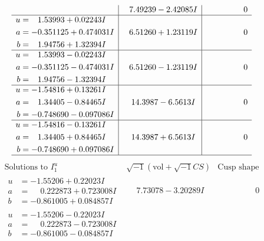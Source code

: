 \documentclass[1p]{elsarticle_modified}
\theoremstyle{definition}
\newcommand{\I}{\sqrt{-1}}
\begin{document}
$$\begin{array}{c|c|c}
 & \phantom{-}7.49239 - 2.42085 I & \phantom{-0.000000 } 0 \\ \hline\begin{aligned}
u &= \phantom{-}1.53993 + 0.02243 I \\
a &= -0.351125 + 0.474031 I \\
b &= \phantom{-}1.94756 + 1.32394 I\end{aligned}
 & \phantom{-}6.51260 + 1.23119 I & \phantom{-0.000000 } 0 \\ \hline\begin{aligned}
u &= \phantom{-}1.53993 - 0.02243 I \\
a &= -0.351125 - 0.474031 I \\
b &= \phantom{-}1.94756 - 1.32394 I\end{aligned}
 & \phantom{-}6.51260 - 1.23119 I & \phantom{-0.000000 } 0 \\ \hline\begin{aligned}
u &= -1.54816 + 0.13261 I \\
a &= \phantom{-}1.34405 - 0.84465 I \\
b &= -0.748690 - 0.097086 I\end{aligned}
 & \phantom{-}14.3987 - 6.5613 I & \phantom{-0.000000 } 0 \\ \hline\begin{aligned}
u &= -1.54816 - 0.13261 I \\
a &= \phantom{-}1.34405 + 0.84465 I \\
b &= -0.748690 + 0.097086 I\end{aligned}
 & \phantom{-}14.3987 + 6.5613 I & \phantom{-0.000000 } 0\\
 \hline 
 \end{array}$$\newpage$$\begin{array}{c|c|c}  
\text{Solutions to }I^u_{1}& \I (\text{vol} + \sqrt{-1}CS) & \text{Cusp shape}\\
 \hline 
\begin{aligned}
u &= -1.55206 + 0.22023 I \\
a &= \phantom{-}0.222873 + 0.723008 I \\
b &= -0.861005 + 0.084857 I\end{aligned}
 & \phantom{-}7.73078 - 3.20289 I & \phantom{-0.000000 } 0 \\ \hline\begin{aligned}
u &= -1.55206 - 0.22023 I \\
a &= \phantom{-}0.222873 - 0.723008 I \\
b &= -0.861005 - 0.084857 I\end{aligned}

\end{array}$$
\end{document}
